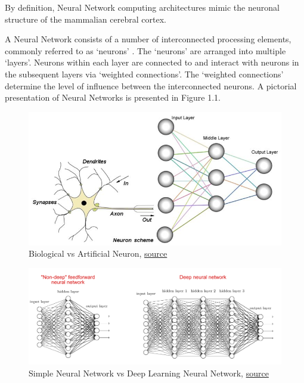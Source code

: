 By definition, Neural Network computing architectures mimic the neuronal structure of the mammalian cerebral cortex. 

A Neural Network consists of a number of interconnected processing elements, commonly referred to as ‘neurons’ \cite{goh1995back}. The ‘neurons’ are arranged into multiple ‘layers’. Neurons within each layer are connected to and interact with neurons in the subsequent layers via ‘weighted connections’. The ‘weighted connections’ determine the level of influence between the interconnected neurons. A pictorial presentation of Neural Networks is presented in Figure 1.1. 

\begin{figure}
	\centering
	\includegraphics[width=1.0\columnwidth]{introduction/fig1a.jpeg}
	\caption{Biological vs Artificial Neuron, \href{https://54e779d2-a-62cb3a1a-s-sites.googlegroups.com/site/mrstevensonstechclassroom/hl-topics-only/4a-robotics-ai/neural-networks-computational-intelligence/Biological\%20vs\%20artificial\%20neuron.jpeg?attachauth=ANoY7cqMmj19FWvS5ZScxTm4AYPR7gp5OXR8mmegEe9VdE5N2pO_7KVYIA_oniPAsFBdG_Z2KIOIWWMZIhueb0m5EFIoE31mK9gl8UStTgYLeAyrMAYuqpNBTyGdRVSjx_5SgesKiyCP6wWhHptFr9_AhsTsXxuZbEjkCw45qyENjz2llQT8Fj-_vvPAnt8UyFXctSyLwadVcdv31CTNlLbjmLz6dekyA0aUR34gQMcoUMypraP9PlWZx988r4oOQzzQ2IbtD2JhHN5WZ42oww3UPK_Fk_otT5BmPieFdvAHXNuxX4MjEvV43HMsqAtfEJoLH1CC-mtDt94MsNARnSe_CJ7SrOSp9_EyuK_oSf_JLUQfRvBUwMM\%3D&attredirects=0}{source}}
\end{figure}


\begin{figure}
	\includegraphics[width=1.0\columnwidth]{introduction/fig1b.png}
	\caption{Simple Neural Network vs Deep Learning Neural Network,
	\href{https://i.stack.imgur.com/OH3gI.png}{source}
	}
\end{figure}


